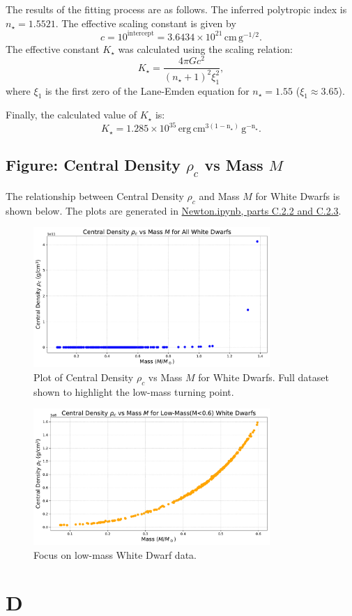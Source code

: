 \documentclass[12pt]{article}
\begin{document}
The results of the fitting process are as follows. The inferred polytropic index is \( n_\star = 1.5521 \). The effective scaling constant is given by
\[
c = 10^{\text{intercept}} = 3.6434 \times 10^{21} \, \mathrm{cm \, g^{-1/2}}.
\]
The effective constant \( K_\star \) was calculated using the scaling relation:
\[
K_\star = \frac{4 \pi G c^2}{(n_\star + 1)^2 \xi_1^2},
\]
where \( \xi_1 \) is the first zero of the Lane-Emden equation for \( n_\star = 1.55 \) (\( \xi_1 \approx 3.65 \)).

Finally, the calculated value of \( K_\star \) is:
\[
K_\star = 1.285 \times 10^{35} \, \mathrm{erg \, cm^{3(1-n_\star)} \, g^{-n_\star}}.
\]

\subsection{Figure: Central Density \(\rho_c\) vs Mass \(M\)}

The relationship between Central Density \(\rho_c\) and Mass \(M\) for White Dwarfs is shown below. The plots are generated in \href{Newton.ipynb}{Newton.ipynb, parts C.2.2 and C.2.3}.

\begin{figure}[H] %
    \centering
    \includegraphics[width=0.8\textwidth]{Newton_PartC2.2.pdf}
    \caption{Plot of Central Density \(\rho_c\) vs Mass \(M\) for White Dwarfs. Full dataset shown to highlight the low-mass turning point.}
    \label{fig:newton-partc2.2}
\end{figure}

\begin{figure}[H] %
    \centering
    \includegraphics[width=0.8\textwidth]{Newton_PartC2.3.pdf}
    \caption{Focus on low-mass White Dwarf data.}
    \label{fig:newton-partc2.3}
\end{figure}

\section{D}
\end{document}
